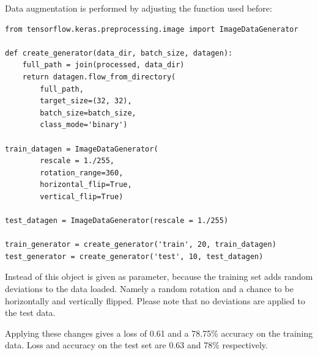 Data augmentation is performed by adjusting the  function used before:

\begin{lstlisting}
from tensorflow.keras.preprocessing.image import ImageDataGenerator

def create_generator(data_dir, batch_size, datagen):
    full_path = join(processed, data_dir)
    return datagen.flow_from_directory(
        full_path,
        target_size=(32, 32),
        batch_size=batch_size,
        class_mode='binary')

train_datagen = ImageDataGenerator(
        rescale = 1./255,
        rotation_range=360,
        horizontal_flip=True,
        vertical_flip=True)

test_datagen = ImageDataGenerator(rescale = 1./255)

train_generator = create_generator('train', 20, train_datagen)
test_generator = create_generator('test', 10, test_datagen)
\end{lstlisting}

Instead of  this object is given as parameter, because the training set adds random deviations to the data loaded. Namely a random rotation and a chance to be horizontally and vertically flipped.
Please note that no deviations are applied to the test data.

Applying these changes gives a loss of 0.61 and a 78.75\% accuracy on the training data.
Loss and accuracy on the test set are 0.63 and 78\% respectively.

